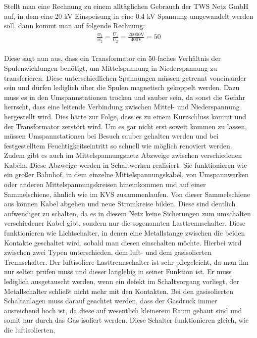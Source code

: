 Stellt man eine Rechnung zu einem alltäglichen Gebrauch der TWS Netz GmbH auf, in dem eine 20 kV Einspeisung in eine 0.4 kV Spannung umgewandelt werden 
soll, dann kommt man auf folgende Rechnung:
\begin{eqnarray}
\frac{w_1}{w_2}=\frac{U_1}{U_2}=\frac{20000\text{V}}{400\text{V}}=50
\label{eqn:Beispiel Wicklungen}
\end{eqnarray}
\\
Diese sagt nun aus, dass ein Transformator ein 50-faches Verhältnis der Spulenwicklungen benötigt, um Mittelspannung in Niederspannung zu transferieren. Diese 
unterschiedlichen Spannungen müssen getrennt voneinander sein und dürfen lediglich über die Spulen magnetisch gekoppelt werden. Dazu muss es in den 
Umspannstationen trocken und sauber sein, da sonst die Gefahr herrscht, dass eine leitende Verbindung zwischen Mittel- und Niederspannung hergestellt wird. 
Dies hätte zur Folge, dass es zu einem Kurzschluss kommt und der Transformator zerstört wird. Um es gar nicht erst soweit kommen zu lassen, müssen Umspannstationen 
bei Besuch sauber gehalten werden und bei festgestelltem Feuchtigkeitseintritt so schnell wie möglich renoviert werden. \autocite{Weigerber.2013} 
\\
Zudem gibt es auch im Mittelspannungsnetz Abzweige zwischen verschiedenen Kabeln. Diese Abzweige werden in Schaltwerken realisiert. Sie funktionieren wie ein 
großer Bahnhof, in dem einzelne Mittelspannungskabel, von \zB Umspannwerken oder anderen Mittelspannungskreisen hineinkommen und auf einer Sammelschiene, 
ähnlich wie im KVS zusammenlaufen. Von dieser Sammelschiene aus können Kabel abgehen und neue Stromkreise bilden. Diese sind deutlich aufwendiger zu schalten, 
da es in diesem Netz keine Sicherungen zum umschalten verschiedener Kabel gibt, sondern nur die sogenannten Lasttrennschalter. Diese funktionieren wie 
Lichtschalter, in denen  eine Metallstange zwischen die beiden Kontakte geschaltet wird, sobald man diesen einschalten möchte. Hierbei wird zwischen zwei 
Typen unterschieden, dem luft- und dem gasisolierten Trennschalter. 
Der luftisoliere Lasttrennschalter ist sehr pflegeleicht, da man ihn nur selten prüfen 
muss und dieser langlebig in seiner Funktion ist. Er muss lediglich ausgetauscht werden, wenn ein defekt im Schaltvorgang vorliegt, \zB der Metallschalter 
schließt nicht mehr mit den Kontakten. Bei den gasisolierten Schaltanlagen muss darauf geachtet werden, dass der Gasdruck immer ausreichend hoch ist, da 
diese auf wesentlich kleinerem Raum gebaut sind und somit nur durch das Gas isoliert werden. Diese Schalter funktionieren gleich, wie die luftisolierten, 
